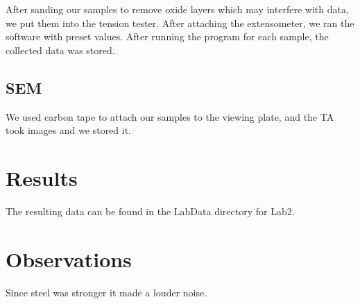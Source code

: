 \documentclass{article}
\begin{document}
After sanding our samples to remove oxide layers which may interfere with data, we put them into the tension tester. After attaching the extensometer, we ran the software with preset values. After running the program for each sample, the collected data was stored.
\subsection{SEM}

We used carbon tape to attach our samples to the viewing plate, and the TA took images and we stored it.
\section{Results}

The resulting data can be found in the LabData directory for Lab2.
\section{Observations}

Since steel was stronger it made a louder noise.
\end{document}
